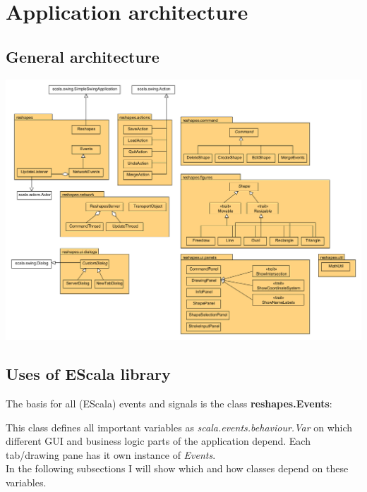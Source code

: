 \chapter{Application architecture}

\section{General architecture}

\includegraphics[width=1\textwidth]{img/class_diagram}

\section{Uses of EScala library}

The basis for all (EScala) events and signals is the class \textbf{reshapes.Events}: 


This class defines all important variables as \textit{scala.events.behaviour.Var} on which different GUI and business logic parts of the application depend. 
Each tab/drawing pane has it own instance of \textit{Events}. \\
In the following subsections I will show which and how classes depend on these variables.

